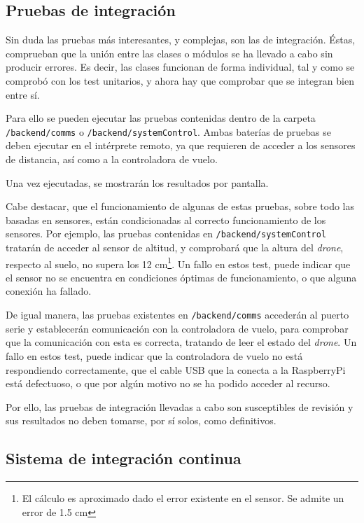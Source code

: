 \subsection{Pruebas de integración}

Sin duda las pruebas más interesantes, y complejas, son las de integración. Éstas, comprueban que la unión entre las clases o módulos se ha llevado a cabo sin producir errores. Es decir, las clases funcionan de forma individual, tal y como se comprobó con los test unitarios, y ahora hay que comprobar que se integran bien entre sí. 

Para ello se pueden ejecutar las pruebas contenidas dentro de la carpeta \texttt{/backend/comms} o \texttt{/backend/systemControl}. Ambas baterías de pruebas se deben ejecutar en el intérprete remoto, ya que requieren de acceder a los sensores de distancia, así como a la controladora de vuelo. 

Una vez ejecutadas, se mostrarán los resultados por pantalla. 

Cabe destacar, que el funcionamiento de algunas de estas pruebas, sobre todo las basadas en sensores, están condicionadas al correcto funcionamiento de los sensores. Por ejemplo, las pruebas contenidas en \texttt{/backend/systemControl} tratarán de acceder al sensor de altitud, y comprobará que la altura del \emph{drone}, respecto al suelo, no supera los 12 cm\footnote{El cálculo es aproximado dado el error existente en el sensor. Se admite un error de 1.5 cm}. Un fallo en estos test, puede indicar que el sensor no se encuentra en condiciones óptimas de funcionamiento, o que alguna conexión ha fallado. 

De igual manera, las pruebas existentes en \texttt{/backend/comms} accederán al puerto serie y establecerán comunicación con la controladora de vuelo, para comprobar que la comunicación con esta es correcta, tratando de leer el estado del \emph{drone}. Un fallo en estos test, puede indicar que la controladora de vuelo no está respondiendo correctamente, que el cable USB que la conecta a la RaspberryPi está defectuoso, o que por algún motivo no se ha podido acceder al recurso.

Por ello, las pruebas de integración llevadas a cabo son susceptibles de revisión y sus resultados no deben tomarse, por sí solos, como definitivos. 


\subsection{Sistema de integración continua}

